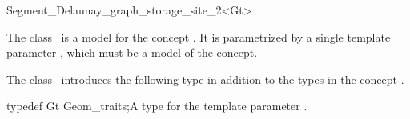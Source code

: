 



\begin{ccRefClass}{Segment_Delaunay_graph_storage_site_2<Gt>}


\ccDefinition
  
The class \ccRefName\ is a model for the concept
. It is parametrized by a single
template parameter , which must be a model of the
 concept.


\ccIsModel
{}

\ccTypes

The class \ccRefName\ introduces the following type in addition to the
types in the concept .

\ccTypedef
{typedef Gt Geom_traits;}{A type for the template parameter .}




\end{ccRefClass}
